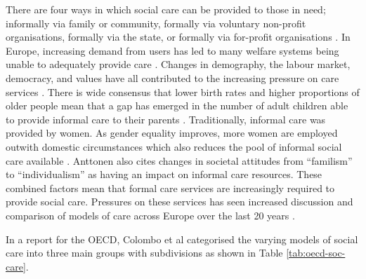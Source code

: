 \documentclass[12pt,]{report}
\begin{document}
There are four ways in which social care can be provided to those in
need; informally via family or community, formally via voluntary
non-profit organisations, formally via the state, or formally via
for-profit organisations \citep{RN346}. In Europe, increasing demand
from users has led to many welfare systems being unable to adequately
provide care \citep{RN344, RN414}. Changes in demography, the labour
market, democracy, and values have all contributed to the increasing
pressure on care services \citep{RN406, RN342, RN414}. There is wide
consensus that lower birth rates and higher proportions of older people
mean that a gap has emerged in the number of adult children able to
provide informal care to their parents
\citep{RN342, RN343, RN344, RN346, RN345, RN414}. Traditionally,
informal care was provided by women. As gender equality improves, more
women are employed outwith domestic circumstances which also reduces the
pool of informal social care available \citep{RN342}. Anttonen
\citeyearpar{RN342} also cites changes in societal attitudes from
``familism'' to ``individualism'' as having an impact on informal care
resources. These combined factors mean that formal care services are
increasingly required to provide social care. Pressures on these
services has seen increased discussion and comparison of models of care
across Europe over the last 20 years \citep{RN347, RN348, RN346, RN349}.

In a report for the OECD, Colombo et al \citeyearpar{RN414} categorised
the varying models of social care into three main groups with
subdivisions as shown in Table \ref{tab:oecd-soc-care}.
\end{document}
